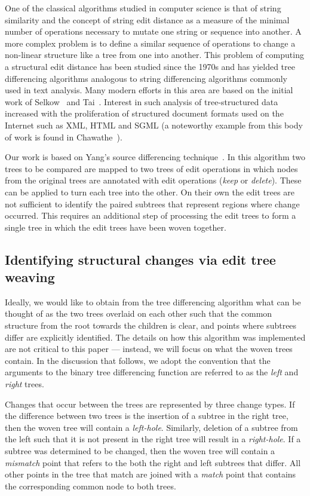 One of the classical algorithms studied in computer science is that of string
similarity and the concept of string edit distance as a measure of the minimal
number of operations necessary to mutate one string or sequence into another.
A more complex problem is to define a similar sequence of operations to change
a non-linear structure like a tree from one into another.  This problem of
computing a structural edit distance has been studied since the 1970s and has
yielded tree differencing algorithms analogous to string differencing
algorithms commonly used in text analysis.  Many modern efforts in this area
are based on the initial work of Selkow~\cite{selkow77tree} and
Tai~\cite{tai79tree}.  Interest in such analysis of tree-structured data
increased with the proliferation of structured document formats used on the
Internet such as XML, HTML and SGML (a noteworthy example from this body
of work is found in Chawathe~\cite{chawathe96change}).

Our work is based on Yang's source differencing technique~\cite{yang91diff}.
In this algorithm two trees to be compared are mapped to two trees of edit
operations in which nodes from the original trees are annotated with edit
operations ({\it keep} or {\it delete}).  These can be applied to turn each tree into the
other.  On their own the edit trees are not sufficient to identify the paired
subtrees that represent regions where change occurred.  This requires an
additional step of processing the edit trees to form a single tree in which the
edit trees have been woven together.

\subsection{Identifying structural changes via edit tree weaving} 
\label{sec:weaving}

Ideally, we would like to obtain from the tree differencing algorithm what can
be thought of as the two trees overlaid on each other such that the common
structure from the root towards the children is clear, and points where subtrees
differ are explicitly identified.  The details on how this algorithm was 
implemented are not critical to this paper --- instead, we will focus on what the
woven trees contain.  In the discussion that follows, we adopt the 
convention that the arguments to the binary tree differencing function are
referred to as the \emph{left} and \emph{right} trees.  

Changes that occur between the trees are represented by three change types. If
the difference between two trees is the insertion of a subtree in the right
tree, then the woven tree will contain a \emph{left-hole}.  Similarly,
deletion of a subtree from the left such that it is not present in the right
tree will result in a \emph{right-hole}.  If a subtree was determined to be
changed, then the woven tree will contain a \emph{mismatch} point that refers
to the both the right and left subtrees that differ.  All other points in the
tree that match are joined with a \emph{match} point that contains the
corresponding common node to both trees.  

